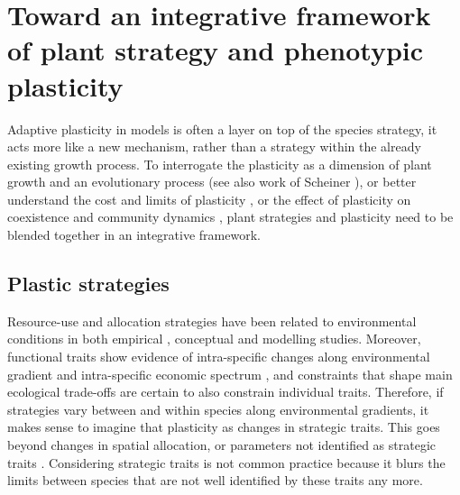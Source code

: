 {%
\textbf{}

\section{Toward an integrative framework of plant strategy and phenotypic plasticity}

Adaptive plasticity in models is often a layer on top of the species strategy, it acts more like a new mechanism, rather than a strategy within the already existing growth process. To interrogate the plasticity as a dimension of plant growth and an evolutionary process \parencite{bradshaw_evolutionary_1965} (see also work of Scheiner \parencite{scheiner_genetics_1989, scheiner_genetics_2002 ,scheiner_genetics_2012}), or better understand the cost and limits of plasticity \cite{dewitt_costs_1998, callahan_phenotypic_2008, auld_re-evaluating_2009}, or the effect of plasticity on coexistence and community dynamics \cite{hart_how_2016}, plant strategies and plasticity need to be blended together in an integrative framework.

\subsection{Plastic strategies}

Resource-use and allocation strategies have been related to environmental conditions in both empirical \parencite{wright_leaves_2002, ackerly_functional_2004, poorter_leaf_2006}, conceptual \parencite{grime_evidence_1977, westoby_leaf-height-seed_1998} and modelling\parencite{kleidon_global_2000, scheiter_impacts_2009, reineking_environmental_2006} studies. Moreover, functional traits show evidence of intra-specific changes along environmental gradient \parencite{kichenin_contrasting_2013} and intra-specific economic spectrum \parencite{hu_novel_2015}, and constraints that shape main ecological trade-offs are certain to also constrain individual traits. Therefore, if strategies vary between and within species along environmental gradients, it makes sense to imagine that plasticity as changes in strategic traits. This goes beyond changes in spatial allocation\parencite{schapendonk_lingra_1998}, or parameters not identified as strategic traits \cite{lohier_explaining_2014, feller_mathematical_2015}. Considering strategic traits is not common practice because it blurs the limits between species that are not well identified by these traits any more.

}
